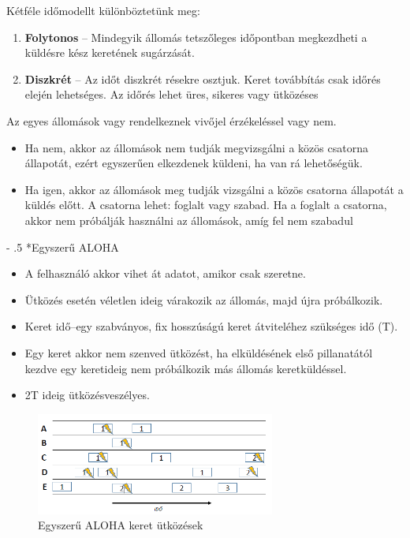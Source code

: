 \documentclass[12pt]{article}
\makeatletter
\renewcommand\paragraph{%
	\@startsection{paragraph}{4}{0mm}%
	{-\baselineskip}%
	{.5\baselineskip}%
	{\normalfont\normalsize\bfseries}}
\makeatother
\begin{document}
    \noindent Kétféle időmodellt különböztetünk meg:
    \begin{enumerate}
        \item \textbf{\small Folytonos} – Mindegyik állomás tetszőleges időpontban megkezdheti a küldésre kész keretének sugárzását.
        \item \textbf{\small Diszkrét} – Az időt diszkrét résekre osztjuk. Keret továbbítás csak időrés elején lehetséges. Az időrés lehet üres, sikeres vagy ütközéses
    \end{enumerate}

    \noindent Az egyes állomások vagy rendelkeznek vivőjel érzékeléssel vagy nem.
    \begin{itemize}[leftmargin=7.5mm]
        \renewcommand{\labelitemi}{$\vcenter{\hbox{\tiny$\bullet$}}$}
        \item Ha nem, akkor az állomások nem tudják megvizsgálni a közös csatorna állapotát, ezért egyszerűen elkezdenek küldeni, ha van rá lehetőségük.
        \item Ha igen, akkor az állomások meg tudják vizsgálni a közös csatorna állapotát a küldés előtt. A csatorna lehet: foglalt vagy szabad. Ha a foglalt a csatorna, akkor nem próbálják használni az állomások, amíg fel nem szabadul
    \end{itemize}

    \paragraph*{Egyszerű ALOHA \\}

    \begin{itemize}[leftmargin=7.5mm]
        \renewcommand{\labelitemi}{$\vcenter{\hbox{\tiny$\bullet$}}$}
        \item A felhasználó akkor vihet át adatot, amikor csak szeretne.
        \item Ütközés esetén véletlen ideig várakozik az állomás, majd újra próbálkozik.
        \item Keret idő–egy szabványos, fix hosszúságú keret átviteléhez szükséges idő (T).
        \item Egy keret akkor nem szenved ütközést, ha elküldésének első pillanatától kezdve egy keretideig nem próbálkozik más állomás keretküldéssel.
        \item 2T ideig ütközésveszélyes.
    \end{itemize}
    \begin{figure}[H]
        \centering
        \includegraphics[width=0.7\textwidth]{img/egyszeru_aloha.png}
        \caption{Egyszerű ALOHA keret ütközések}	
    \end{figure}
\end{document}
